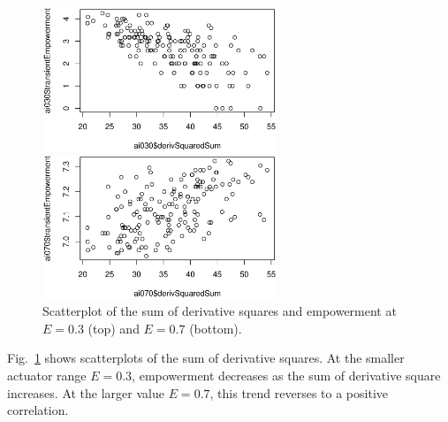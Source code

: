 \documentclass[conference]{IEEEtran}
\begin{document}
\begin{figure}

  \begin{center}

    \includegraphics[width=7cm]{n08_full_small_corr_dss_emp_ai030.eps}

    \includegraphics[width=7cm]{n08_full_small_corr_dss_emp_ai070.eps}

  \end{center}

  \caption{Scatterplot of the sum of derivative squares and
    empowerment at $E = 0.3$ (top) and $E = 0.7$ (bottom).}
  \label{fig_dssemp}

\end{figure}

Fig.~\ref{fig_dssemp} shows scatterplots of the sum of derivative
squares. At the smaller actuator range $E = 0.3$, empowerment
decreases as the sum of derivative square increases. At the larger
value $E = 0.7$, this trend reverses to a positive correlation.
\end{document}
